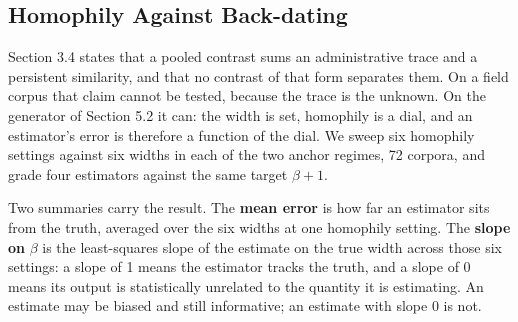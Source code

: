 \documentclass[twoside,11pt]{article}
\begin{document}
\subsection{Homophily Against Back-dating}

Section 3.4 states that a pooled contrast sums an administrative trace and a persistent similarity, and that no contrast of that form separates them. On a field corpus that claim cannot be tested, because the trace is the unknown. On the generator of Section 5.2 it can: the width is set, homophily is a dial, and an estimator's error is therefore a function of the dial. We sweep six homophily settings against six widths in each of the two anchor regimes, 72 corpora, and grade four estimators against the same target \(\beta + 1\).

Two summaries carry the result. The \textbf{mean error} is how far an estimator sits from the truth, averaged over the six widths at one homophily setting. The \textbf{slope on} \(\beta\) is the least-squares slope of the estimate on the true width across those six settings: a slope of 1 means the estimator tracks the truth, and a slope of 0 means its output is statistically unrelated to the quantity it is estimating. An estimate may be biased and still informative; an estimate with slope 0 is not.
\end{document}
